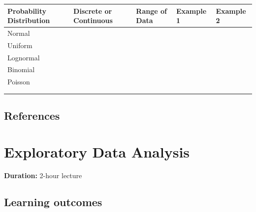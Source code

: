 \documentclass[
]{book}
\newcounter{none} %
\begin{document}
{\def\LTcaptype{none} %
\begin{longtable}[]{@{}
  >{\raggedright\arraybackslash}p{}
  >{\raggedright\arraybackslash}p{}
  >{\raggedright\arraybackslash}p{}
  >{\raggedright\arraybackslash}p{}
  >{\raggedright\arraybackslash}p{}@{}}
\toprule\noalign{}
\begin{minipage}[b]{\linewidth}\raggedright
Probability Distribution
\end{minipage} & \begin{minipage}[b]{\linewidth}\raggedright
Discrete or Continuous
\end{minipage} & \begin{minipage}[b]{\linewidth}\raggedright
Range of Data
\end{minipage} & \begin{minipage}[b]{\linewidth}\raggedright
Example 1
\end{minipage} & \begin{minipage}[b]{\linewidth}\raggedright
Example 2
\end{minipage} \\
\midrule\noalign{}
\endhead
\bottomrule\noalign{}
\endlastfoot
Normal & & & & \\
Uniform & & & & \\
Lognormal & & & & \\
Binomial & & & & \\
Poisson & & & & \\
& & & & \\
& & & & \\
\end{longtable}
}

\section{References}\label{references-3}

\chapter{Exploratory Data Analysis}\label{eda}

\textbf{Duration:} 2-hour lecture

\section{Learning outcomes}\label{learning-outcomes-4}
\end{document}
